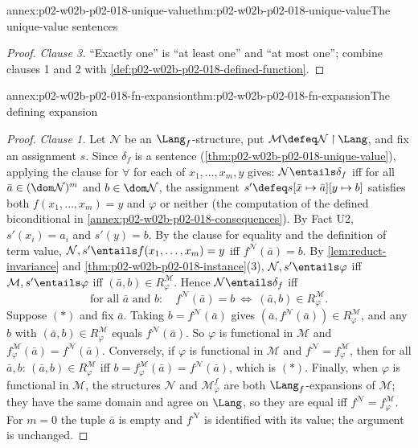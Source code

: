 \begin{annexitem}{annex:p02-w02b-p02-018-unique-value}{thm:p02-w02b-p02-018-unique-value}{The unique-value sentences}
\begin{proof}
\emph{Clause 3.}  ``Exactly one'' is ``at least one'' and ``at most one'';
combine clauses 1 and 2 with
\cref{def:p02-w02b-p02-018-defined-function}.
\end{proof}
\end{annexitem}

\begin{annexitem}{annex:p02-w02b-p02-018-fn-expansion}{thm:p02-w02b-p02-018-fn-expansion}{The defining expansion}
\begin{proof}
\emph{Clause 1.}  Let \(\mathcal N\) be an \(\Lang_f\)-structure, put
\(\mathcal M\defeq\mathcal N\mathbin{\upharpoonright}\Lang\), and fix an
assignment \(s\).  Since \(\delta_f\) is a sentence
(\cref{thm:p02-w02b-p02-018-unique-value}), applying the clause for
\(\forall\) for each of \(x_1,\ldots,x_m,y\) gives:
\(\mathcal N\entails\delta_f\) iff for all \(\bar a\in(\dom\mathcal N)^m\)
and \(b\in\dom\mathcal N\), the assignment
\(s'\defeq s[\bar x\mapsto\bar a][y\mapsto b]\) satisfies both
\(f(x_1,\ldots,x_m)=y\) and \(\varphi\) or neither (the computation of the
defined biconditional in \cref{annex:p02-w02b-p02-018-consequences}).  By
Fact U2, \(s'(x_i)=a_i\) and \(s'(y)=b\).  By the clause for equality and the
definition of term value, \(\mathcal N,s'\entails f(x_1,\ldots,x_m)=y\) iff
\(f^{\mathcal N}(\bar a)=b\).  By \cref{lem:reduct-invariance} and
\cref{thm:p02-w02b-p02-018-instance}(3),
\(\mathcal N,s'\entails\varphi\) iff \(\mathcal M,s'\entails\varphi\) iff
\((\bar a,b)\in R^{\mathcal M}_{\varphi}\).  Hence
\(\mathcal N\entails\delta_f\) iff
\[
 \text{for all }\bar a\text{ and }b:\quad
 f^{\mathcal N}(\bar a)=b\ \Longleftrightarrow\
 (\bar a,b)\in R^{\mathcal M}_{\varphi}.
 \tag{\(\ast\)}
\]
Suppose \((\ast)\) and fix \(\bar a\).  Taking \(b=f^{\mathcal N}(\bar a)\)
gives \((\bar a,f^{\mathcal N}(\bar a))\in R^{\mathcal M}_{\varphi}\), and any
\(b\) with \((\bar a,b)\in R^{\mathcal M}_{\varphi}\) equals
\(f^{\mathcal N}(\bar a)\).  So \(\varphi\) is functional in \(\mathcal M\)
and \(f^{\mathcal M}_{\varphi}(\bar a)=f^{\mathcal N}(\bar a)\).  Conversely,
if \(\varphi\) is functional in \(\mathcal M\) and
\(f^{\mathcal N}=f^{\mathcal M}_{\varphi}\), then for all \(\bar a,b\):
\((\bar a,b)\in R^{\mathcal M}_{\varphi}\) iff
\(b=f^{\mathcal M}_{\varphi}(\bar a)=f^{\mathcal N}(\bar a)\), which is
\((\ast)\).  Finally, when \(\varphi\) is functional in \(\mathcal M\), the
structures \(\mathcal N\) and \(\mathcal M^{f}_{\varphi}\) are both
\(\Lang_f\)-expansions of \(\mathcal M\); they have the same domain and
agree on \(\Lang\), so they are equal iff
\(f^{\mathcal N}=f^{\mathcal M}_{\varphi}\).  For \(m=0\) the tuple
\(\bar a\) is empty and \(f^{\mathcal N}\) is identified with its value; the
argument is unchanged.


\end{proof}
\end{annexitem}
